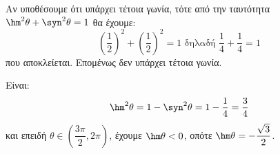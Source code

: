 \begin{alist}
\item Αν υποθέσουμε ότι υπάρχει τέτοια γωνία, τότε από την ταυτότητα $\hm ^2\theta + \syn ^2\theta = 1$ θα έχουμε:
\[\left(\frac{1}{2}\right)^2 + \left(\frac{1}{2}\right)^2 = 1 \text{ δηλαδή } \frac{1}{4} + \frac{1}{4} = 1\]
που αποκλείεται. Επομένως δεν υπάρχει τέτοια γωνία.
\item Είναι:
\[\hm ^2\theta = 1 - \syn ^2\theta = 1 - \frac{1}{4} = \frac{3}{4}\]
και επειδή $\theta \in \left(\dfrac{3\pi}{2}, 2\pi\right)$, έχουμε $\hm \theta < 0$, οπότε $\hm \theta = -\dfrac{\sqrt{3}}{2}$.
\end{alist}

